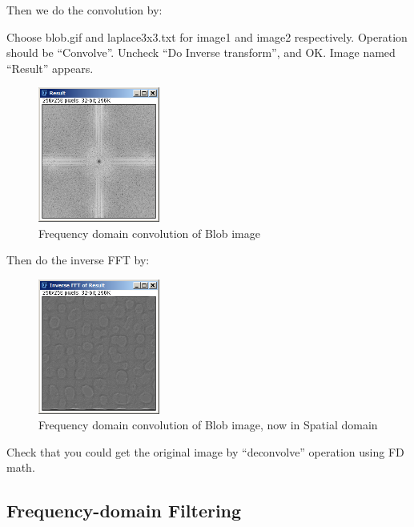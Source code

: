 \begin{indentexercise}{1}
Then we do the convolution by:


Choose blob.gif and laplace3x3.txt for image1 and image2 respectively. 
Operation should be ``Convolve''. Uncheck ``Do Inverse transform'', and OK.
Image named ``Result'' appears. 

\begin{figure}[htbp]
\begin{center}
\includegraphics[width=4cm]{fig/fig1_3_fftconvolv8.png}
\caption{Frequency domain convolution of Blob image}
\label{fig:fftconv8}
\end{center}
\end{figure}

Then do the inverse FFT by:


\begin{figure}[htbp]
\begin{center}
\includegraphics[width=4cm]{fig/fig1_3_fftconvolv7.png}
\caption{Frequency domain convolution of Blob image, now in Spatial domain}
\label{fig:fftconv7}
\end{center}
\end{figure}

Check that you could get the original image by ``deconvolve'' operation using
FD math.
\end{indentexercise}

\subsection{Frequency-domain Filtering}

